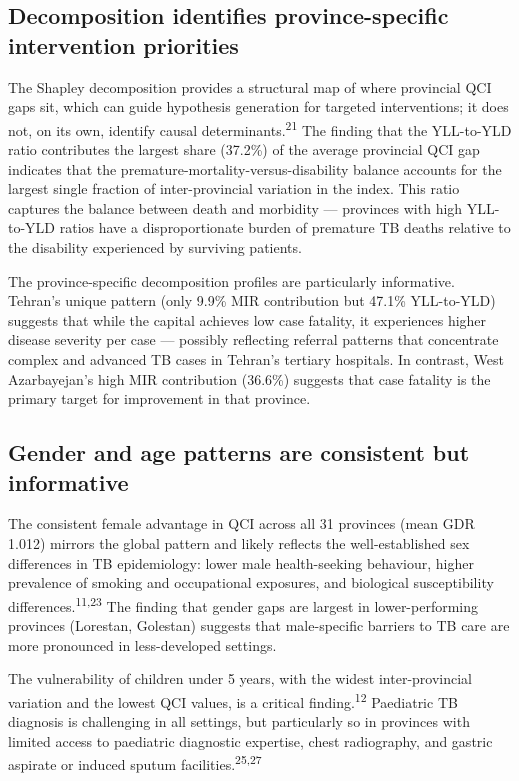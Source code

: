 \documentclass[12pt]{article}
\begin{document}
\subsection{Decomposition identifies province-specific intervention priorities}

The Shapley decomposition provides a structural map of where provincial QCI gaps sit, which can guide hypothesis generation for targeted interventions; it does not, on its own, identify causal determinants.\textsuperscript{21} The finding that the YLL-to-YLD ratio contributes the largest share (37.2\%) of the average provincial QCI gap indicates that the premature-mortality-versus-disability balance accounts for the largest single fraction of inter-provincial variation in the index. This ratio captures the balance between death and morbidity --- provinces with high YLL-to-YLD ratios have a disproportionate burden of premature TB deaths relative to the disability experienced by surviving patients.

The province-specific decomposition profiles are particularly informative. Tehran's unique pattern (only 9.9\% MIR contribution but 47.1\% YLL-to-YLD) suggests that while the capital achieves low case fatality, it experiences higher disease severity per case --- possibly reflecting referral patterns that concentrate complex and advanced TB cases in Tehran's tertiary hospitals. In contrast, West Azarbayejan's high MIR contribution (36.6\%) suggests that case fatality is the primary target for improvement in that province.

\subsection{Gender and age patterns are consistent but informative}

The consistent female advantage in QCI across all 31 provinces (mean GDR 1.012) mirrors the global pattern and likely reflects the well-established sex differences in TB epidemiology: lower male health-seeking behaviour, higher prevalence of smoking and occupational exposures, and biological susceptibility differences.\textsuperscript{11,23} The finding that gender gaps are largest in lower-performing provinces (Lorestan, Golestan) suggests that male-specific barriers to TB care are more pronounced in less-developed settings.

The vulnerability of children under 5 years, with the widest inter-provincial variation and the lowest QCI values, is a critical finding.\textsuperscript{12} Paediatric TB diagnosis is challenging in all settings, but particularly so in provinces with limited access to paediatric diagnostic expertise, chest radiography, and gastric aspirate or induced sputum facilities.\textsuperscript{25,27}
\end{document}
